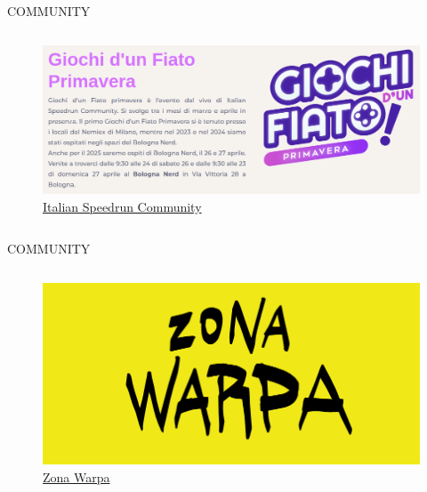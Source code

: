 \documentclass[aspectratio=1610]{beamer}
\begin{document}
\begin{frame}{COMMUNITY}
    \begin{columns}
        \column{\textwidth}
        \begin{figure}
            \includegraphics[width=\linewidth]{img/isc.png}
            \caption{{\href{https://italianspeedruncommunity.com/}{Italian Speedrun Community}}}
        \end{figure}
    \end{columns}
\end{frame}

\begin{frame}{COMMUNITY}
    \begin{columns}
        \column{\textwidth}
        \begin{figure}
            \includegraphics[width=\linewidth]{img/warpa.png}
            \caption{{\href{https://zonawarpa.it/}{Zona Warpa}}}
        \end{figure}
    \end{columns}
\end{frame}
\end{document}

